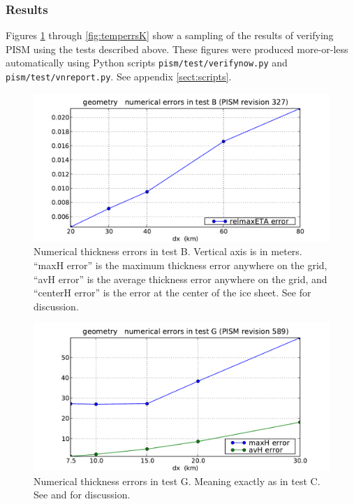 \documentclass[11pt,final]{amsart}
\begin{document}
\subsubsection*{Results}  Figures \ref{fig:thickerrsB} through \ref{fig:temperrsK} show a sampling of the results of verifying PISM using the tests described above.  These figures were produced more-or-less automatically using Python scripts \verb|pism/test/verifynow.py| and \verb|pism/test/vnreport.py|.  See appendix \ref{sect:scripts}.

\begin{figure}[ht]
\includegraphics[width=4.8in,keepaspectratio=true]{figs/thickerrs_B}
\caption{Numerical thickness errors in test B.  Vertical axis is in meters. ``maxH error'' is the maximum thickness error anywhere on the grid, ``avH error'' is the average thickness error anywhere on the grid, and ``centerH error'' is the error at the center of the ice sheet.  See \cite{BLKCB} for discussion.}
\label{fig:thickerrsB}
\end{figure}

\begin{figure}[ht]
\includegraphics[width=4.8in,keepaspectratio=true]{figs/thickerrs_G}
\caption{Numerical thickness errors in test G.  Meaning exactly as in test C.  See \cite{BBL} and \cite{BLKCB} for discussion.}
\label{fig:thickerrsG}
\end{figure}
\end{document}
